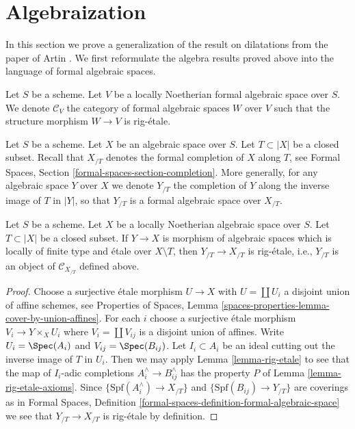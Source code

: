\section{Algebraization}
\label{section-algebraization}

\noindent
In this section we prove a generalization of the result on dilatations
from the paper of Artin \cite{ArtinII}. We first reformulate the algebra
results proved above into the language of formal algebraic spaces.

\medskip\noindent
Let $S$ be a scheme. Let $V$ be a locally Noetherian formal algebraic space
over $S$. We denote $\mathcal{C}_V$ the category of formal algebraic
spaces $W$ over $V$ such that the structure morphism $W \to V$ is rig-\'etale.

\medskip\noindent
Let $S$ be a scheme. Let $X$ be an algebraic space over $S$.
Let $T \subset |X|$ be a closed subset. Recall that $X_{/T}$ denotes
the formal completion of $X$ along $T$, see 
Formal Spaces, Section \ref{formal-spaces-section-completion}.
More generally, for any algebraic space $Y$ over $X$ we
denote $Y_{/T}$ the completion of $Y$ along the inverse
image of $T$ in $|Y|$, so that $Y_{/T}$ is a formal algebraic space
over $X_{/T}$.

\begin{lemma}
\label{lemma-etale-gives-rig-etale}
Let $S$ be a scheme. Let $X$ be a locally Noetherian algebraic space over $S$.
Let $T \subset |X|$ be a closed subset. If $Y \to X$ is morphism of
algebraic spaces which is locally of finite type and \'etale over
$X \setminus T$, then $Y_{/T} \to X_{/T}$ is rig-\'etale, i.e., $Y_{/T}$
is an object of $\mathcal{C}_{X_{/T}}$ defined above.
\end{lemma}

\begin{proof}
Choose a surjective \'etale morphism $U \to X$ with $U = \coprod U_i$
a disjoint union of affine schemes, see Properties of Spaces, Lemma
\ref{spaces-properties-lemma-cover-by-union-affines}.
For each $i$ choose a surjective \'etale morphism $V_i \to Y \times_X U_i$
where $V_i = \coprod V_{ij}$ is a disjoint union of affines.
Write $U_i = \Spec(A_i)$ and $V_{ij} = \Spec(B_{ij})$.
Let $I_i \subset A_i$ be an ideal cutting out the inverse image
of $T$ in $U_i$. Then we may apply
Lemma \ref{lemma-rig-etale}
to see that the map of $I_i$-adic completions
$A_i^\wedge \to B_{ij}^\wedge$ has the property
$P$ of Lemma \ref{lemma-rig-etale-axioms}.
Since $\{\text{Spf}(A_i^\wedge) \to X_{/T}\}$ and
$\{\text{Spf}(B_{ij}) \to Y_{/T}\}$ are coverings as in
Formal Spaces, Definition
\ref{formal-spaces-definition-formal-algebraic-space}
we see that $Y_{/T} \to X_{/T}$ is rig-\'etale by definition.
\end{proof}

